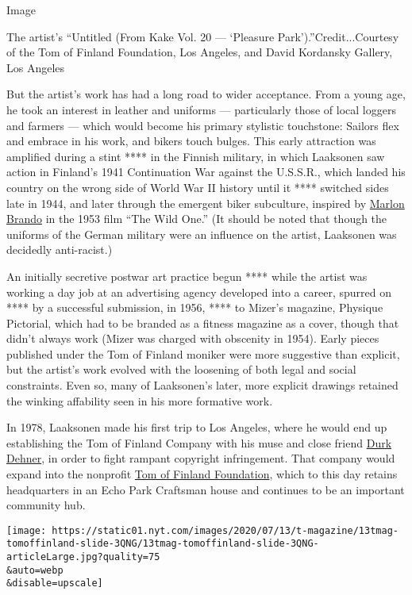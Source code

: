 Image

The artist's ``Untitled (From Kake Vol. 20 --- `Pleasure
Park').''Credit...Courtesy of the Tom of Finland Foundation, Los
Angeles, and David Kordansky Gallery, Los Angeles

But the artist's work has had a long road to wider acceptance. From a
young age, he took an interest in leather and uniforms --- particularly
those of local loggers and farmers --- which would become his primary
stylistic touchstone: Sailors flex and embrace in his work, and bikers
touch bulges. This early attraction was amplified during a stint **** in
the Finnish military, in which Laaksonen saw action in Finland's 1941
Continuation War against the U.S.S.R., which landed his country on the
wrong side of World War II history until it **** switched sides late in
1944, and later through the emergent biker subculture, inspired by
\href{https://www.nytimes.com/topic/person/marlon-brando}{Marlon Brando}
in the 1953 film ``The Wild One.'' (It should be noted that though the
uniforms of the German military were an influence on the artist,
Laaksonen was decidedly anti-racist.)

An initially secretive postwar art practice begun **** while the artist
was working a day job at an advertising agency developed into a career,
spurred on **** by a successful submission, in 1956, **** to Mizer's
magazine, Physique Pictorial, which had to be branded as a fitness
magazine as a cover, though that didn't always work (Mizer was charged
with obscenity in 1954). Early pieces published under the Tom of Finland
moniker were more suggestive than explicit, but the artist's work
evolved with the loosening of both legal and social constraints. Even
so, many of Laaksonen's later, more explicit drawings retained the
winking affability seen in his more formative work.

In 1978, Laaksonen made his first trip to Los Angeles, where he would
end up establishing the Tom of Finland Company with his muse and close
friend
\href{https://www.nytimes.com/slideshow/2016/02/23/t-magazine/inside-tom-house-tom-of-finland-in-los-angeles.html}{Durk
Dehner}, in order to fight rampant copyright infringement. That company
would expand into the nonprofit \href{https://www.tomoffinland.org/}{Tom
of Finland Foundation}, which to this day retains headquarters in an
Echo Park Craftsman house and continues to be an important community
hub.

\texttt{[image: https://static01.nyt.com/images/2020/07/13/t-magazine/13tmag-tomoffinland-slide-3QNG/13tmag-tomoffinland-slide-3QNG-articleLarge.jpg?quality=75\\\&auto=webp\\\&disable=upscale]}


